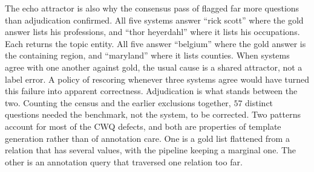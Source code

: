 The echo attractor is also why the consensus pass of  flagged far
more questions than adjudication confirmed. All five systems answer ``rick
scott'' where the gold answer lists his professions, and ``thor heyerdahl''
where it lists his occupations. Each returns the topic entity. All five answer
``belgium'' where the gold answer is the containing region, and ``maryland''
where it lists counties. When systems agree with one another against gold, the
usual cause is a shared attractor, not a label error. A policy of rescoring
whenever three systems agree would have turned this failure into apparent
correctness. Adjudication is what stands between the two. Counting the census
and the earlier exclusions together, $57$ distinct questions needed the
benchmark, not the system, to be corrected. Two patterns account for most of the
CWQ defects, and both are properties of template generation rather than of
annotation care. One is a gold list flattened from a relation that has several
values, with the pipeline keeping a marginal one. The other is an annotation
query that traversed one relation too far.

\endinput
